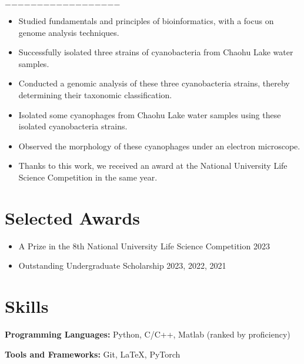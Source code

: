 \documentclass{resume}
\begin{document}
    \noindent\hfil$-$\hfil$-$\hfil$-$\hfil$-$\hfil$-$\hfil$-$\hfil$-$\hfil$-$\hfil$-$\hfil$-$\hfil$-$\hfil$-$\hfil$-$\hfil$-$\hfil$-$\hfil$-$\hfil$-$\hfil$-$\hfil
    \begin{itemize}
      \item Studied fundamentals and principles of bioinformatics, with a focus on genome analysis techniques.
      \item Successfully isolated three strains of cyanobacteria from Chaohu Lake water samples.
      \item Conducted a genomic analysis of these three cyanobacteria strains, thereby determining their taxonomic classification.
      \item Isolated some cyanophages from Chaohu Lake water samples using these isolated cyanobacteria strains.
      \item Observed the morphology of these cyanophages under an electron microscope.
      \item Thanks to this work, we received an award at the National University Life Science Competition in the same year.
    \end{itemize}

\section{Selected Awards}
  \begin{itemize}
      \item A Prize in the 8th National University Life Science Competition \hfill 2023
      \item Outstanding Undergraduate Scholarship  \hfill 2023, 2022, 2021
  \end{itemize}


\section{Skills}
  \textbf{Programming Languages:} \small Python, C/C++, Matlab (ranked by proficiency)

  \textbf{Tools and Frameworks:} \small Git, \LaTeX, PyTorch
\end{document}
